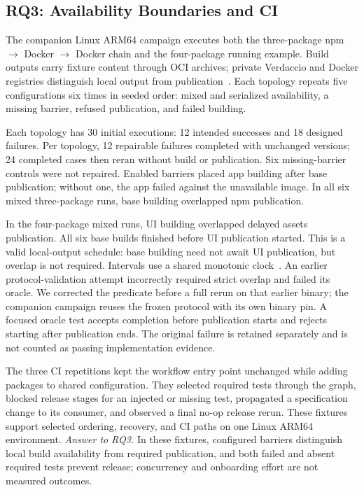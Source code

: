 \subsection{RQ3: Availability Boundaries and CI}
The companion Linux ARM64 campaign executes both the three-package
npm $\to$ Docker $\to$ Docker chain and the four-package running example.
Build outputs carry fixture content through OCI archives; private Verdaccio
and Docker registries distinguish local output from publication~\cite{oci,buildkit}.
Each topology repeats five configurations six times in seeded order: mixed and
serialized availability, a missing barrier, refused publication, and failed building.

Each topology has 30 initial executions: 12 intended successes and 18 designed
failures. Per topology, 12 repairable failures completed with unchanged versions; 24
completed cases then reran without build or publication. Six missing-barrier
controls were not repaired. Enabled barriers placed app building after base
publication; without one, the app failed against the unavailable image. In all
six mixed three-package runs, base building overlapped npm publication.

In the four-package mixed runs, UI building overlapped delayed assets
publication. All six base builds finished before UI publication started. This
is a valid local-output schedule: base building need not await UI publication,
but overlap is not required. Intervals use a shared monotonic clock~\cite{pytime}.
An earlier protocol-validation attempt incorrectly required strict overlap
and failed its oracle. We corrected the predicate before a full rerun on that
earlier binary; the companion campaign reuses the frozen protocol with its
own binary pin. A focused oracle test accepts completion before publication
starts and rejects starting after publication ends. The original failure is
retained separately and is not counted as passing implementation evidence.

The three CI repetitions kept the workflow entry point unchanged while adding
packages to shared configuration. They selected required tests through the graph,
blocked release stages for an injected or missing test, propagated a specification
change to its consumer, and observed a final no-op release rerun. These fixtures
support selected ordering, recovery, and CI paths on one Linux ARM64 environment.
\emph{Answer to RQ3.} In these fixtures, configured barriers distinguish local
build availability from required publication, and both failed and absent
required tests prevent release; concurrency and onboarding effort are not
measured outcomes.
